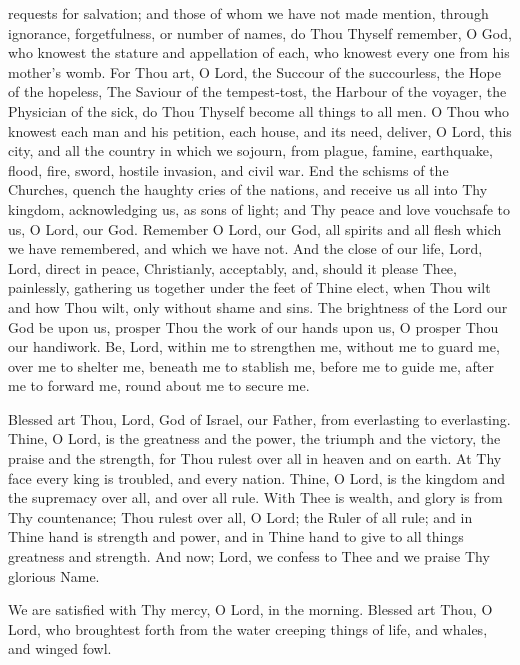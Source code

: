 requests for salvation; and those of whom we have not made mention, through ignorance, forgetfulness, or number of names, do Thou Thyself remember, O God, who knowest the stature and appellation of each, who knowest every one from his mother’s womb. For Thou art, O Lord, the Succour of the succourless,  the Hope of the hopeless, The Saviour of the tempest‑tost, the Harbour of the voyager, the Physician of the sick, do Thou Thyself become all things to all men. O Thou who knowest each man and his petition, each house, and its need, deliver, O Lord, this city, and all the country in which we sojourn, from plague, famine, earthquake, flood, fire, sword, hostile invasion, and civil war. End the schisms of the Churches, quench the haughty cries of the nations, and receive us all into Thy kingdom, acknowledging us, as sons of light; and Thy peace and love vouchsafe to us, O Lord, our God. Remember O Lord, our God, all spirits and all flesh which we have remembered, and which we have not. And the close of our life, Lord, Lord, direct in peace, Christianly, acceptably, and, should it please Thee, painlessly, gathering us together under the feet of Thine elect, when Thou wilt and how Thou wilt, only without shame and sins. The brightness of the Lord our God be upon us, prosper Thou the work of our hands upon us, O prosper Thou our handiwork. Be, Lord, within me to strengthen me, without me to guard me, over me to shelter me, beneath me to stablish me, before me to guide me, after me to forward me, round about me to secure me.


Blessed art Thou, Lord, God of Israel, our Father, from everlasting to everlasting.  Thine, O Lord, is the greatness and the power, the triumph and the victory, the praise and the strength, for Thou rulest over all in heaven and on earth. At Thy face every king is troubled, and every nation.  Thine, O Lord, is the kingdom and the supremacy over all, and over all rule. With Thee is wealth, and glory is from Thy countenance; Thou rulest over all, O Lord; the Ruler of all rule; and in Thine hand is strength and power, and in Thine hand to give to all things greatness and strength. And now; Lord, we confess to Thee and we praise Thy glorious Name.



We are satisfied with Thy mercy, O Lord, in the morning. Blessed art Thou, O Lord, who broughtest forth from the water creeping things of life, and whales, and winged fowl.

